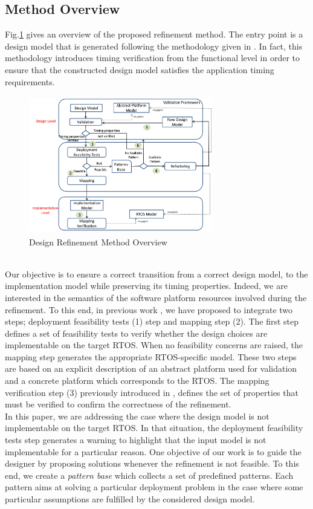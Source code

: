 \documentclass[runningheads,a4paper]{llncs}
\begin{document}
\subsection {Method Overview}
Fig.\ref{myprocess} gives an overview of the proposed refinement method. The entry point is a design model that is generated following the methodology given in \cite{optimum}. In fact, this methodology introduces timing verification from the functional level in order to ensure that the constructed design model satisfies the application timing requirements. 
\vspace{-0.2cm}
\begin{figure}
\centering
\includegraphics[width = 8cm,height=6cm]{Pic/process}
\caption{Design Refinement Method Overview}
\label{myprocess}
\end{figure}
\vspace{-0.5cm}
\\Our objective is to ensure a correct transition from a correct design model, to the implementation model while preserving its timing properties. Indeed, we are interested in the semantics of the software platform resources involved during the refinement. To this end, in previous work \cite {SEAA}, we have proposed to integrate two steps; deployment feasibility tests (1) step and mapping step (2). The first step defines a set of feasibility tests to verify whether the design choices are implementable on the target RTOS. When no feasibility concerns are raised, the mapping step generates the appropriate RTOS-specific model. These two steps are based on an explicit description of an abstract platform used for validation \cite{SEAA} and a concrete platform which corresponds to the RTOS. The mapping verification step (3) previously introduced in \cite{models}, defines the set of properties that must be verified to confirm the correctness of the refinement. 
\\In this paper, we are addressing the case where the design model is not implementable on the target RTOS. In that situation, the deployment feasibility tests step generates a warning to highlight that the input model is not implementable for a particular reason. One objective of our work is to guide the designer by proposing solutions whenever the refinement is not feasible. To this end, we create a \emph{pattern base} which collects a set of predefined patterns. Each pattern aims at solving a particular deployment problem in the case where some particular assumptions are fulfilled by the considered design model. 
\end{document}
